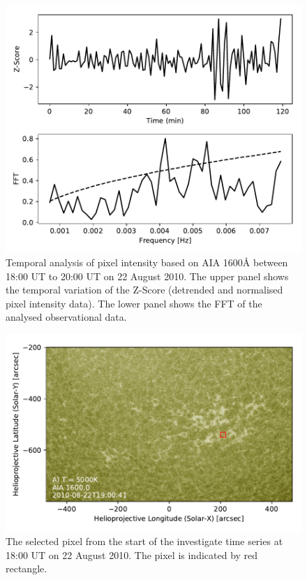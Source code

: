 \documentclass[twocolumn]{aastex62}
\begin{document}
\begin{figure}
    \centering
    \label{fft_sim}
    \includegraphics[scale=0.55]{imrescale/fft_obs.pdf}
    \caption{Temporal analysis of pixel intensity based on AIA 1600{\AA} between 18:00 UT to 20:00 UT on 22 August 2010. The upper panel shows the temporal variation of the Z-Score (detrended and normalised pixel intensity data). The lower panel shows the FFT of the analysed observational data. }
\end{figure}

\begin{figure}
    \label{obs}
    \centering
    \includegraphics[scale=0.5]{imrescale/obs_data.pdf}
    \caption{The selected pixel from the start of the investigate time series at 18:00 UT on 22 August 2010. The pixel is indicated by red rectangle.}
\end{figure}
\end{document}
